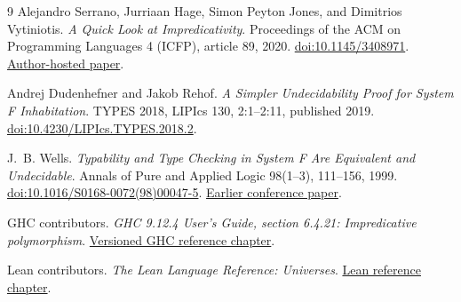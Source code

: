 \documentclass[11pt]{article}
\begin{document}
\begin{thebibliography}{9}
Alejandro Serrano, Jurriaan Hage, Simon Peyton Jones, and Dimitrios Vytiniotis.
\emph{A Quick Look at Impredicativity}.
Proceedings of the ACM on Programming Languages 4 (ICFP), article 89, 2020.
\href{https://doi.org/10.1145/3408971}{doi:10.1145/3408971}.
\href{https://simon.peytonjones.org/assets/pdfs/impredicativity.pdf}{Author-hosted paper}.

Andrej Dudenhefner and Jakob Rehof.
\emph{A Simpler Undecidability Proof for System F Inhabitation}.
TYPES 2018, LIPIcs 130, 2:1--2:11, published 2019.
\href{https://drops.dagstuhl.de/entities/document/10.4230/LIPIcs.TYPES.2018.2}
{doi:10.4230/LIPIcs.TYPES.2018.2}.

J.~B. Wells.
\emph{Typability and Type Checking in System F Are Equivalent and Undecidable}.
Annals of Pure and Applied Logic 98(1--3), 111--156, 1999.
\href{https://doi.org/10.1016/S0168-0072(98)00047-5}
{doi:10.1016/S0168-0072(98)00047-5}.
\href{https://people.eecs.berkeley.edu/~necula/Papers/WellsSystemFUndecidable.pdf}
{Earlier conference paper}.

GHC contributors.
\emph{GHC 9.12.4 User's Guide, section 6.4.21: Impredicative polymorphism}.
\href{https://downloads.haskell.org/ghc/9.12.4/docs/users_guide/exts/impredicative_types.html}
{Versioned GHC reference chapter}.

Lean contributors.
\emph{The Lean Language Reference: Universes}.
\href{https://lean-lang.org/doc/reference/latest/The-Type-System/Universes/}
{Lean reference chapter}.
\end{thebibliography}
\end{document}
